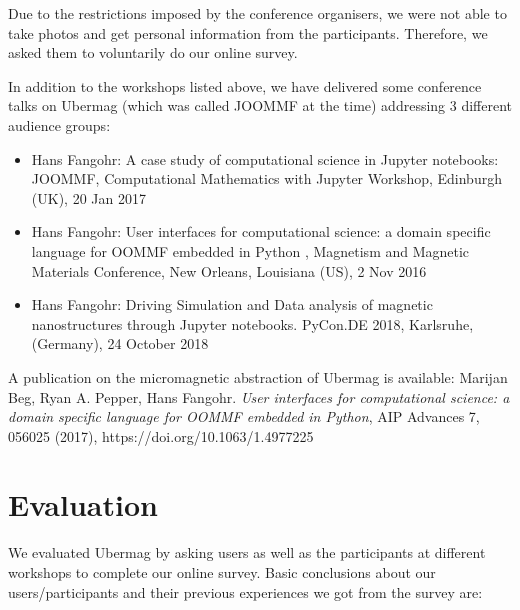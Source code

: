 \documentclass{deliverablereport}
\begin{document}
Due to the restrictions imposed by the conference organisers, we were
not able to take photos and get personal information from the
participants. Therefore, we asked them to voluntarily do our online
survey.

In addition to the workshops listed above, we have delivered some conference
talks on Ubermag (which was called JOOMMF at the time) addressing 3
different audience groups:
\begin{itemize}
\item Hans Fangohr: A case study of computational science in Jupyter
  notebooks: JOOMMF, Computational Mathematics with Jupyter Workshop,
  Edinburgh (UK), 20 Jan 2017
\item Hans Fangohr: User interfaces for computational science: a
  domain specific language for OOMMF embedded in Python , Magnetism
  and Magnetic Materials Conference, New Orleans, Louisiana (US), 2
  Nov 2016
\item Hans Fangohr: Driving Simulation and Data analysis of magnetic
  nanostructures through Jupyter notebooks. PyCon.DE 2018, Karlsruhe,
  (Germany), 24 October 2018
\end{itemize}

A publication on the micromagnetic abstraction of Ubermag is
available: Marijan Beg, Ryan A. Pepper, Hans Fangohr. \emph{User interfaces for
  computational science: a domain specific language for OOMMF embedded
  in Python}, AIP Advances 7, 056025 (2017), https://doi.org/10.1063/1.4977225

\section{Evaluation}

We evaluated Ubermag by asking users as well as the participants at
different workshops to complete our online survey. Basic conclusions
about our users/participants and their previous experiences we got
from the survey are:
\end{document}
